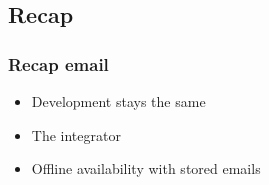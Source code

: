 \subsection{Recap}
\begin{frame}
    \frametitle{Recap email}
    \begin{itemize}
        \item Development stays the same
        \item The integrator
        \item Offline availability with stored emails
    \end{itemize}
\end{frame}

